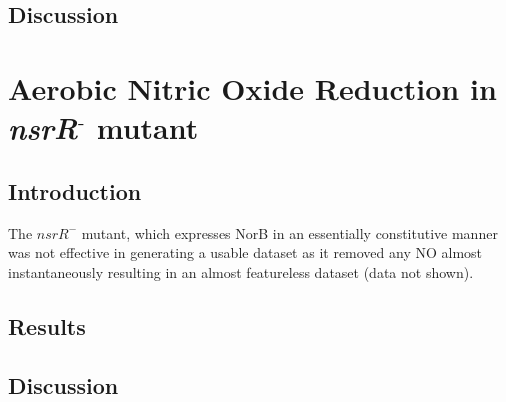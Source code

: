 \subsection{Discussion}
\section{\texorpdfstring{Aerobic Nitric Oxide Reduction in \textit{nsrR$^\textrm{-}$} mutant}{Aerobic Nitric Oxide Reduction in nsrR- mutant}}
\subsection{Introduction}
 The $\mathit{nsrR}^-$ mutant, which expresses NorB in an essentially constitutive manner was not effective in generating a usable dataset as it removed any NO almost instantaneously resulting in an almost featureless dataset (data not shown).
\subsection{Results}
\subsection{Discussion}
